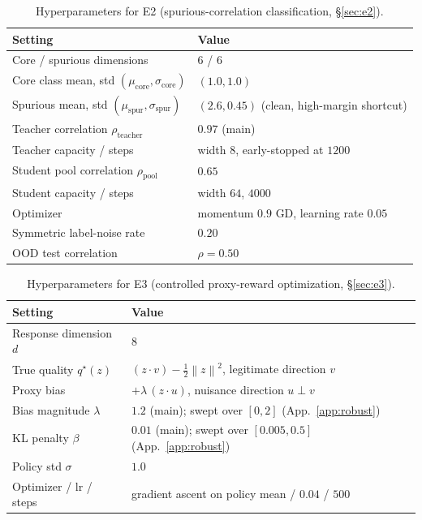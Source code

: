 \documentclass[10pt]{article} %
\theoremstyle{plain}
\theoremstyle{remark}
\newcommand{\norm}[1]{\left\lVert #1 \right\rVert}
\begin{document}
\begin{table}[h]
\caption{Hyperparameters for E2 (spurious-correlation classification, \S\ref{sec:e2}).}
\label{tab:e2}
\begin{center}
\begin{tabular}{ll}
\hline
Setting & Value \\
\hline
Core / spurious dimensions & $6$ / $6$ \\
Core class mean, std $(\mu_\mathrm{core},\sigma_\mathrm{core})$ & $(1.0, 1.0)$ \\
Spurious mean, std $(\mu_\mathrm{spur},\sigma_\mathrm{spur})$ & $(2.6, 0.45)$ (clean, high-margin shortcut) \\
Teacher correlation $\rho_\mathrm{teacher}$ & $0.97$ (main) \\
Teacher capacity / steps & width $8$, early-stopped at $1200$ \\
Student pool correlation $\rho_\mathrm{pool}$ & $0.65$ \\
Student capacity / steps & width $64$, $4000$ \\
Optimizer & momentum $0.9$ GD, learning rate $0.05$ \\
Symmetric label-noise rate & $0.20$ \\
OOD test correlation & $\rho=0.50$ \\
\hline
\end{tabular}
\end{center}
\end{table}

\begin{table}[h]
\caption{Hyperparameters for E3 (controlled proxy-reward optimization, \S\ref{sec:e3}).}
\label{tab:e3}
\begin{center}
\begin{tabular}{ll}
\hline
Setting & Value \\
\hline
Response dimension $d$ & $8$ \\
True quality $q^\star(z)$ & $(z\cdot v) - \tfrac12\norm{z}^2$, legitimate direction $v$ \\
Proxy bias & $+\lambda\,(z\cdot u)$, nuisance direction $u \perp v$ \\
Bias magnitude $\lambda$ & $1.2$ (main); swept over $[0,2]$ (App.~\ref{app:robust}) \\
KL penalty $\beta$ & $0.01$ (main); swept over $[0.005,0.5]$ (App.~\ref{app:robust}) \\
Policy std $\sigma$ & $1.0$ \\
Optimizer / lr / steps & gradient ascent on policy mean / $0.04$ / $500$ \\
\hline
\end{tabular}
\end{center}
\end{table}
\end{document}
